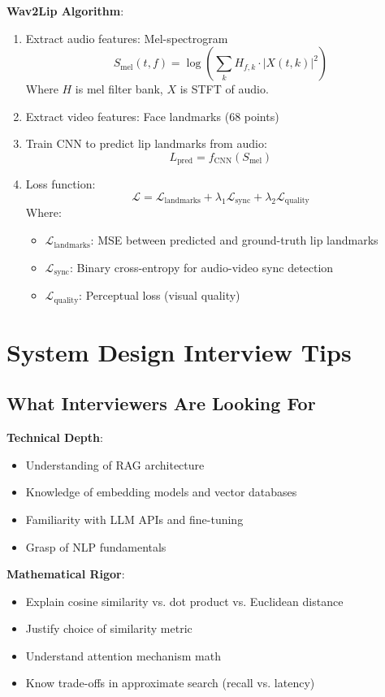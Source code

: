 \documentclass[10pt]{article}
\begin{document}
\textbf{Wav2Lip Algorithm}:
\begin{enumerate}[leftmargin=*]
    \item Extract audio features: Mel-spectrogram
    \[
    S_{\text{mel}}(t, f) = \log\left(\sum_{k} H_{f,k} \cdot |X(t, k)|^2\right)
    \]
    Where $H$ is mel filter bank, $X$ is STFT of audio.

    \item Extract video features: Face landmarks (68 points)

    \item Train CNN to predict lip landmarks from audio:
    \[
    L_{\text{pred}} = f_{\text{CNN}}(S_{\text{mel}})
    \]

    \item Loss function:
    \[
    \mathcal{L} = \mathcal{L}_{\text{landmarks}} + \lambda_1 \mathcal{L}_{\text{sync}} + \lambda_2 \mathcal{L}_{\text{quality}}
    \]
    Where:
    \begin{itemize}
        \item $\mathcal{L}_{\text{landmarks}}$: MSE between predicted and ground-truth lip landmarks
        \item $\mathcal{L}_{\text{sync}}$: Binary cross-entropy for audio-video sync detection
        \item $\mathcal{L}_{\text{quality}}$: Perceptual loss (visual quality)
    \end{itemize}
\end{enumerate}

\section{System Design Interview Tips}

\subsection{What Interviewers Are Looking For}

\textbf{Technical Depth}:
\begin{itemize}[leftmargin=*]
    \item Understanding of RAG architecture
    \item Knowledge of embedding models and vector databases
    \item Familiarity with LLM APIs and fine-tuning
    \item Grasp of NLP fundamentals
\end{itemize}

\textbf{Mathematical Rigor}:
\begin{itemize}[leftmargin=*]
    \item Explain cosine similarity vs. dot product vs. Euclidean distance
    \item Justify choice of similarity metric
    \item Understand attention mechanism math
    \item Know trade-offs in approximate search (recall vs. latency)
\end{itemize}
\end{document}
